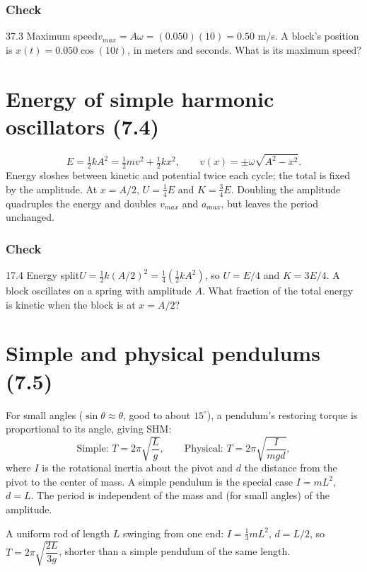 \documentclass[11pt]{article}
\begin{document}
\subsubsection{Check}\mbox{}

\begin{q}{3}{7.3 Maximum speed}{$v_{max} = A\omega = (0.050)(10) = 0.50$ m/s.}
A block's position is $x(t) = 0.050\cos(10t)$, in meters and seconds. What is its maximum speed?
\end{q}

\section{Energy of simple harmonic oscillators (7.4)}\label{sec:4}

\[ E = \tfrac12 kA^2 = \tfrac12 mv^2 + \tfrac12 kx^2, \qquad v(x) = \pm\omega\sqrt{A^2 - x^2}. \]
Energy sloshes between kinetic and potential twice each cycle; the total is fixed by the amplitude. At $x = A/2$, $U = \tfrac14 E$ and $K = \tfrac34 E$. Doubling the amplitude quadruples the energy and doubles $v_{max}$ and $a_{max}$, but leaves the period unchanged.

\subsubsection{Check}\mbox{}

\begin{q}{1}{7.4 Energy split}{$U = \tfrac12 k(A/2)^2 = \tfrac14\left(\tfrac12 kA^2\right)$, so $U = E/4$ and $K = 3E/4$.}
A block oscillates on a spring with amplitude $A$. What fraction of the total energy is kinetic when the block is at $x = A/2$?
\end{q}

\section{Simple and physical pendulums (7.5)}\label{sec:5}

For small angles ($\sin\theta \approx \theta$, good to about $15^\circ$), a pendulum's restoring torque is proportional to its angle, giving SHM:
\[ \text{Simple: } T = 2\pi\sqrt{\frac{L}{g}}, \qquad \text{Physical: } T = 2\pi\sqrt{\frac{I}{mgd}}, \]
where $I$ is the rotational inertia about the pivot and $d$ the distance from the pivot to the center of mass. A simple pendulum is the special case $I = mL^2$, $d = L$. The period is independent of the mass and (for small angles) of the amplitude.
\begin{example}
A uniform rod of length $L$ swinging from one end: $I = \tfrac13 mL^2$, $d = L/2$, so $T = 2\pi\sqrt{\dfrac{2L}{3g}}$, shorter than a simple pendulum of the same length.
\end{example}
\end{document}

